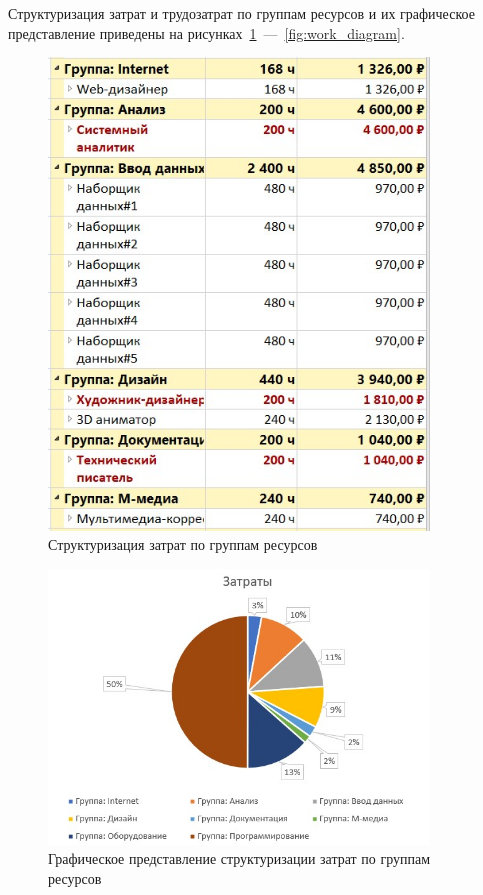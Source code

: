 Структуризация затрат и трудозатрат по группам ресурсов и их графическое представление приведены на рисунках~\ref{fig:group}~---~\ref{fig:work_diagram}.

\begin{figure}[H]
	\centering
	\includegraphics[width=0.9\textwidth]{img/lab2/task3/group.jpg}
	\caption{Структуризация затрат по группам ресурсов}
	\label{fig:group}
\end{figure}

\begin{figure}[H]
	\centering
	\includegraphics[width=0.9\textwidth]{img/lab2/task3/diagram.jpg}
	\caption{Графическое представление структуризации затрат по группам ресурсов}
	\label{fig:graphic_group}
\end{figure}

